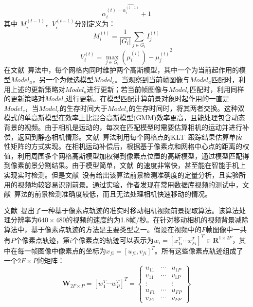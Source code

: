 $$ \alpha_i^{(t) = \hat{\alpha_i^{(t-1)}}}+1$$
其中 $M_i^{(t-1)}$，$V_i^{(t-1)}$分别定义为：
$$ M_i^{(t)} = \frac{1}{|G_i|}\sum_{j\in G_i}I_j^{(t)}$$
$$ V_i^{(t)} = \max_{j \in G_i}{(\mu_i^{(i)})-\mu_j^{(t)}}^2 $$
在文献~算法中，每个网格内同时维护两个高斯模型，其中一个为当前起作用的模型$Model_a$，另一个为候选模型$Model_c$。当观察到当前帧图像与$Model_a$匹配时，利用上述的更新策略对$Model_a$进行更新；若当前帧图像与$Model_c$匹配时，利用同样的更新策略对$Model_c$进行更新。在模型匹配计算前景对象时起作用的一直是$Model_c$，当$Model_c$的生存时间大于$Model_s$的生存时间时，将其两者交换。这种双模式的单高斯模型在效率上比混合高斯模型(GMM)效率更高，且能处理包含动态背景的视频。由于相机是运动的，每次在匹配模型时需要估算相机的运动并进行补偿，返回到静态相机情形。文献~算法利用每个网格点的KLT~\cite{KLT}跟踪结果估算单应性矩阵的方式实现。在相机运动补偿后，根据基于像素点和网格中心点的距离的权值，利用周围多个网格高斯模型加权得到像素点位置的高斯模型，通过模型匹配得到像素前景分割结果。由于模型简单，文献~的速度非常快，甚至能在智能手机上实现实时检测。但是文献~没有给出该算法前景检测准确度的定量分析，且实验所用的视频均较容易识别前景。通过实验，作者发现在常用数据库视频的测试中，文献~算法的前景检测准确度较低，而且无法处理相机快速移动的情况。\par

文献~\cite{ACPRRealTime}提出了一种基于像素点轨迹的准实时移动相机视频前景提取算法。该算法处理分辨率为$640 \times 480$的视频的速度约为1.8帧/秒。在针对移动相机的视频背景减除算法中，基于像素点轨迹的方法是主要类型之一。假设在视频中的$F$帧图像中一共有$P$个像素点轨迹，第$i$个像素点的轨迹可以表示为$w_i={[x_{1i}^T \cdots x_{Fi}^{T}]}^T \in \mathbf{R}^{1 \times 2F}$，其中在每一帧图像中像素点的坐标为$ x_{fi} = {[u_{fi},v_{fi}]}^T$。所有这些像素点轨迹组成了一个$2F \times P$的矩阵：
\begin{equation}
\label{ch5:equ:trajmatrix}
\mathbf{W}_{2F \times P} = {[w_{1}^T \cdots w_{P}^T]}^T = \begin{Bmatrix}
u_{11} & \cdots & u_{1P} \\
v_{11} & \cdots  &  v_{1P}\\
 \vdots &  & \vdots \\
 u_{F1}& \cdots & u_{FP}\\
 v_{F1}& \cdots & v_{FP}
\end{Bmatrix}
\end{equation} \par

